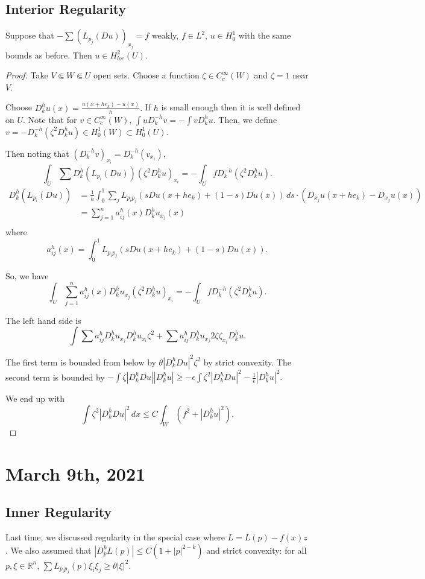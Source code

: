 \documentclass[12pt]{scrartcl}
\newcommand{\R}{\mathbb{R}}
\newcommand{\<}{\langle}
\renewcommand{\>}{\rangle}
\begin{document}
\subsection{Interior Regularity}
\begin{thm} Suppose that $- \sum (L_{p_j}(Du))_{x_j} = f$ weakly, $f \in L^2$, $u \in H_0^1$ with the same bounds as before.  Then $u \in H_{loc}^2(U)$.  
\end{thm} 
\begin{proof}
Take $V \Subset  W  \Subset U$ open sets.  Choose a function $\zeta \in C_c^\infty(W)$ and $\zeta = 1$ near $V$.

Choose $D_k^h u(x) = \frac{u(x + he_k) - u(x)}{h}.$  If $h$ is small enough then it is well defined on $U$.  Note that for $v \in C_c^\infty(W)$, $\int u D_k^{-h} v = -\int vD_k^h u$.  Then, we define $v = -D_k^{-h}(\zeta^2 D_k^h u) \in H_0^1(W) \subset H_0^1(U)$.

Then noting that $(D_k^{-h}v)_{x_i} = D_k^{-h}(v_{x_i})$, 
$$\int_U \sum D_k^h(L_{p_i}(Du))(\zeta^2 D_k^h u)_{x_i} = -\int_U fD_k^{-h}(\zeta^2 D_k^h u).$$
\begin{align*}
D_k^h(L_{p_i}(Du))&= \frac{1}{h}\int_0^1 \sum_{j} L_{p_ip_j}(sDu(x + he_k) + (1 - s)Du(x))\,ds \cdot (D_{x_j}u(x + he_k) - D_{x_j }u(x))\\
&= \sum_{j=1}^n a_{ij}^h(x)  D_k^h u_{x_j}(x)\\
\end{align*}
where $$a_{ij}^h(x) = \int_0^1 L_{p_i p_j} (sDu(x + he_k) + (1-s)Du(x)).$$

So, we have
$$\int_U \sum_{j=1}^n a_{ij}^h(x) D_k^h u_{x_j}(\zeta^2 D_k^h u)_{x_i} = -\int_U f D_k^{-h}(\zeta^2 D_k^h u).$$

The left hand side is 
$$\int \sum a_{ij}^h D_k^h u_{x_j} D_k^h u_{x_i} \zeta^2 + \sum a_{ij}^h D_k^h u_{x_j} 2\zeta \zeta_{x_i} D_k^h u.$$

The first term is bounded from below by $\theta |D_k^h Du|^2 \zeta^2$ by strict convexity.  The second term is bounded by $- \int \zeta |D_k^h Du||D_k^h u| \ge -\epsilon \int \zeta^2 |D_k^h Du|^2 - \frac{1}{\epsilon} |D_k^h u|^2.$ 

We end up with 
$$\int \zeta^2 |D_k^h Du|^2 \,dx \le C \int_W (f^2 + |D_k^h u|^2).$$
\end{proof}
\pagebreak
\section{March 9th, 2021}
\subsection{Inner Regularity}
Last time, we discussed regularity in the special case where $L = L(p) - f(x)z$.  We also assumed that $|D_p^k L(p)| \le C(1 + |p|^{2-k})$ and strict convexity: for all $p, \xi \in \R^n$, $\sum L_{p_i p_j}(p)\xi_i \xi_j \ge \theta|\xi|^2$.  
\end{document}
